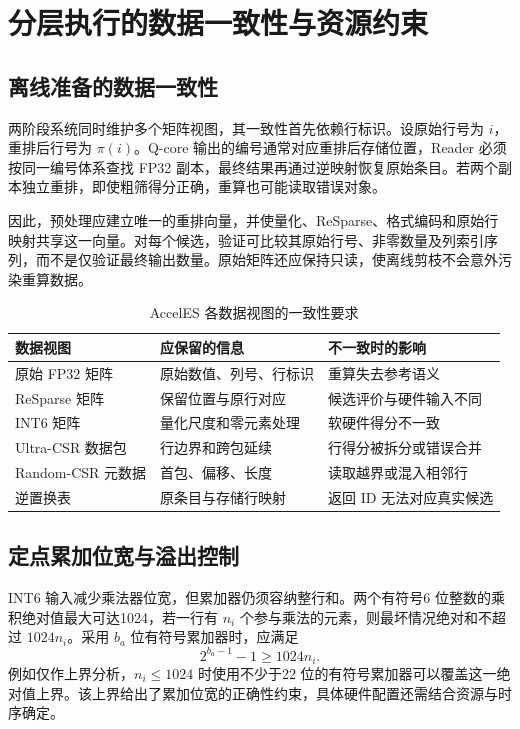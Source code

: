 \section{分层执行的数据一致性与资源约束}
\subsection{离线准备的数据一致性}
两阶段系统同时维护多个矩阵视图，其一致性首先依赖行标识。设原始行号为 $i$，重排后行号为 $\pi(i)$。Q-core 输出的编号通常对应重排后存储位置，Reader 必须按同一编号体系查找 FP32 副本，最终结果再通过逆映射恢复原始条目。若两个副本独立重排，即使粗筛得分正确，重算也可能读取错误对象。

因此，预处理应建立唯一的重排向量，并使量化、ReSparse、格式编码和原始行映射共享这一向量。对每个候选，验证可比较其原始行号、非零数量及列索引序列，而不是仅验证最终输出数量。原始矩阵还应保持只读，使离线剪枝不会意外污染重算数据。

\begin{table}[htbp]\centering\caption{AccelES 各数据视图的一致性要求}
\begin{tabularx}{\textwidth}{p{2.6cm}XX}\toprule
数据视图&应保留的信息&不一致时的影响\\\midrule
原始 FP32 矩阵&原始数值、列号、行标识&重算失去参考语义\\
ReSparse 矩阵&保留位置与原行对应&候选评价与硬件输入不同\\
INT6 矩阵&量化尺度和零元素处理&软硬件得分不一致\\
Ultra-CSR 数据包&行边界和跨包延续&行得分被拆分或错误合并\\
Random-CSR 元数据&首包、偏移、长度&读取越界或混入相邻行\\
逆置换表&原条目与存储行映射&返回 ID 无法对应真实候选\\\bottomrule
\end{tabularx}\end{table}

\subsection{定点累加位宽与溢出控制}
INT6 输入减少乘法器位宽，但累加器仍须容纳整行和。两个有符号6 位整数的乘积绝对值最大可达1024，若一行有 $n_i$ 个参与乘法的元素，则最坏情况绝对和不超过 $1024n_i$。采用 $b_a$ 位有符号累加器时，应满足
\begin{equation}
 2^{b_a-1}-1\geq1024n_i.
\end{equation}
例如仅作上界分析，$n_i\leq1024$ 时使用不少于22 位的有符号累加器可以覆盖这一绝对值上界。该上界给出了累加位宽的正确性约束，具体硬件配置还需结合资源与时序确定。

